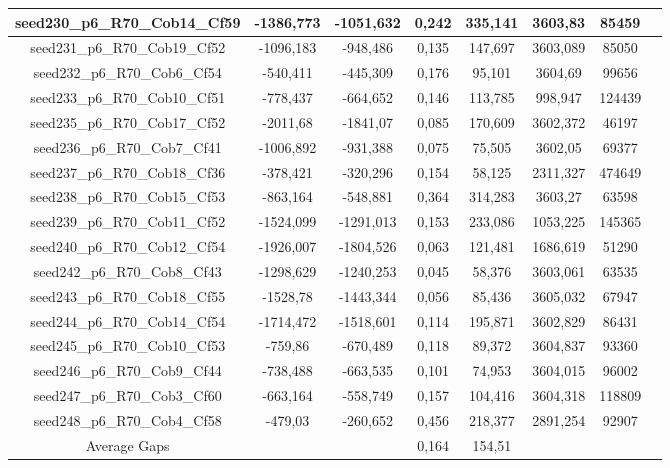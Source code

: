 \documentclass[a4paper]{article}
\begin{document}
\begin{center}
\begin{longtable}{cccccccc}
\hline
seed230\_p6\_R70\_Cob14\_Cf59 & -1386,773 & -1051,632 & 0,242 & 335,141 & 3603,83 & 85459\\
\hline
seed231\_p6\_R70\_Cob19\_Cf52 & -1096,183 & -948,486 & 0,135 & 147,697 & 3603,089 & 85050\\
\hline
seed232\_p6\_R70\_Cob6\_Cf54 & -540,411 & -445,309 & 0,176 & 95,101 & 3604,69 & 99656\\
\hline
seed233\_p6\_R70\_Cob10\_Cf51 & -778,437 & -664,652 & 0,146 & 113,785 & 998,947 & 124439\\
\hline
seed235\_p6\_R70\_Cob17\_Cf52 & -2011,68 & -1841,07 & 0,085 & 170,609 & 3602,372 & 46197\\
\hline
seed236\_p6\_R70\_Cob7\_Cf41 & -1006,892 & -931,388 & 0,075 & 75,505 & 3602,05 & 69377\\
\hline
seed237\_p6\_R70\_Cob18\_Cf36 & -378,421 & -320,296 & 0,154 & 58,125 & 2311,327 & 474649\\
\hline
seed238\_p6\_R70\_Cob15\_Cf53 & -863,164 & -548,881 & 0,364 & 314,283 & 3603,27 & 63598\\
\hline
seed239\_p6\_R70\_Cob11\_Cf52 & -1524,099 & -1291,013 & 0,153 & 233,086 & 1053,225 & 145365\\
\hline
seed240\_p6\_R70\_Cob12\_Cf54 & -1926,007 & -1804,526 & 0,063 & 121,481 & 1686,619 & 51290\\
\hline
seed242\_p6\_R70\_Cob8\_Cf43 & -1298,629 & -1240,253 & 0,045 & 58,376 & 3603,061 & 63535\\
\hline
seed243\_p6\_R70\_Cob18\_Cf55 & -1528,78 & -1443,344 & 0,056 & 85,436 & 3605,032 & 67947\\
\hline
seed244\_p6\_R70\_Cob14\_Cf54 & -1714,472 & -1518,601 & 0,114 & 195,871 & 3602,829 & 86431\\
\hline
seed245\_p6\_R70\_Cob10\_Cf53 & -759,86 & -670,489 & 0,118 & 89,372 & 3604,837 & 93360\\
\hline
seed246\_p6\_R70\_Cob9\_Cf44 & -738,488 & -663,535 & 0,101 & 74,953 & 3604,015 & 96002\\
\hline
seed247\_p6\_R70\_Cob3\_Cf60 & -663,164 & -558,749 & 0,157 & 104,416 & 3604,318 & 118809\\
\hline
seed248\_p6\_R70\_Cob4\_Cf58 & -479,03 & -260,652 & 0,456 & 218,377 & 2891,254 & 92907\\
\hline
\hline
Average Gaps & & & 0,164 & 154,51 & & \\
\hline
\hline
\end{longtable}
\end{center}
\end{document}
